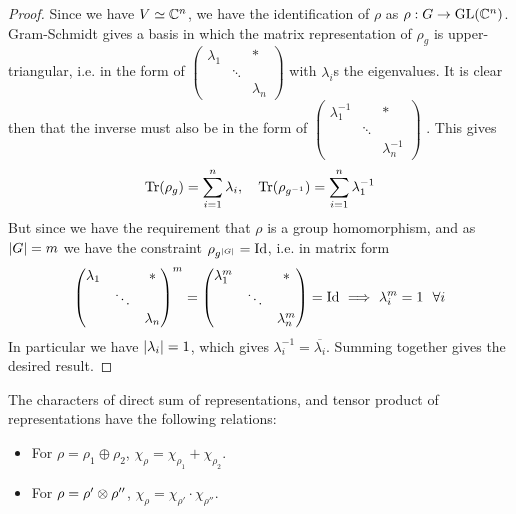 \documentclass{article}
\begin{document}
\begin{proof}
    Since we have $V \simeq \mathbb{C}^n$, we have the identification of $\rho$ as $\rho: G \to \mathrm{GL}(\mathbb{C}^n)$. Gram-Schmidt gives a basis in which the matrix representation of $\rho_g$ is upper-triangular, i.e. in the form of 
    $\left(
    \begin{smallmatrix}
        \lambda_1 & & \ast \\
        & \ddots & \\
        & & \lambda_n
    \end{smallmatrix}\right)
    $
    with $\lambda_i$s the eigenvalues. It is clear then that the inverse must also be in the form of 
    $\left(
    \begin{smallmatrix}
        \lambda_1^{-1} & & \ast \\
        & \ddots & \\
        & & \lambda_n^{-1}
    \end{smallmatrix}\right)
    $
    . This gives
    \[
        \operatorname{Tr}(\rho_g) = \sum_{i = 1}^n \lambda_i, \quad \operatorname{Tr}(\rho_{g^{-1}}) = \sum_{i = 1}^n \lambda_1^{-1}
    \]
    But since we have the requirement that $\rho$ is a group homomorphism, and as $\left|G\right| = m$ we have the constraint $\rho_{g^{\left|G\right|}} = \mathrm{Id}$, i.e. in matrix form
    \[
        \begin{pmatrix}
            \lambda_1 & & \ast \\
            & \ddots & \\
            & & \lambda_n
        \end{pmatrix}^m = 
        \begin{pmatrix}
            \lambda_1^{m} & & \ast \\
            & \ddots & \\
            & & \lambda_n^{m}
        \end{pmatrix} = \mathrm{Id} \ \Longrightarrow\  \lambda_i^m = 1\ \ \forall i
    \]
    In particular we have $\left|\lambda_i\right| = 1$, which gives $\lambda_i^{-1} = \overline{\lambda_i}$. Summing together gives the desired result.
\end{proof}

\begin{proposition}\label{prop: character of direct sum and tensor product}
    The characters of direct sum of representations, and tensor product of representations have the following relations:
    \begin{itemize}
        \item For $\rho = \rho_1 \oplus \rho_2$, $\chi_{\rho} = \chi_{\rho_1} + \chi_{\rho_2}$.
        \item For $\rho = \rho' \otimes \rho''$, $\chi_{\rho} = \chi_{\rho'} \cdot \chi_{\rho''}$.
    \end{itemize}
\end{proposition}
\end{document}
